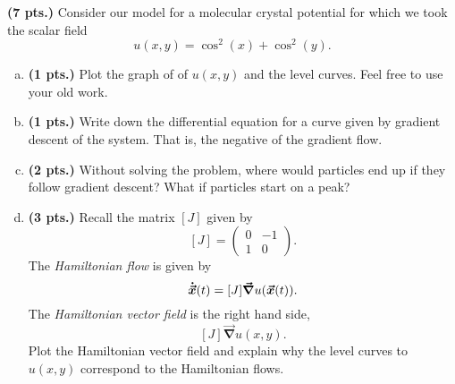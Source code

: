 \documentclass[12pt]{article} %
\newcommand{\grad}{\boldsymbol{\vec{\nabla}}}
\begin{document}
\begin{problem}
\textbf{(7 pts.)} Consider our model for a molecular crystal potential for which we took the scalar field
\[
u(x,y)=\cos^2(x)+\cos^2(y).
\]
\begin{enumerate}[(a)]
\item \textbf{(1 pts.)} Plot the graph of of $u(x,y)$ and the level curves. Feel free to use your old work.
\item \textbf{(1 pts.)} Write down the differential equation for a curve given by gradient descent of the system. That is, the negative of the gradient flow. 
\item \textbf{(2 pts.)} Without solving the problem, where would particles end up if they follow gradient descent? What if particles start on a peak?
\item \textbf{(3 pts.)} Recall the matrix $[J]$ given by
\[
[J] = \begin{pmatrix} 0 & -1 \\ 1 & 0 \end{pmatrix}.
\]
The \emph{Hamiltonian flow} is given by
\[
\boldsymbol{\dot{\vec{x}}}(t) = [J] \grad u(\vecx(t)).
\]
The \emph{Hamiltonian vector field} is the right hand side,
\[
[J] \grad u(x,y).
\]
Plot the Hamiltonian vector field and explain why the level curves to $u(x,y)$ correspond to the Hamiltonian flows.
\end{enumerate}
\end{problem}
\end{document}
